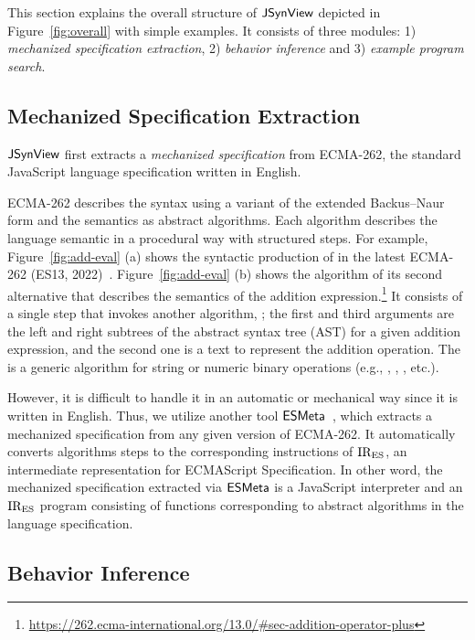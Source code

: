 This section explains the overall structure of $\tool$ depicted in
Figure~\ref{fig:overall} with simple examples.  It consists of three modules: 1)
\textit{mechanized specification extraction}, 2) \textit{behavior inference} and
3) \textit{example program search}.


\subsection{Mechanized Specification Extraction}\label{sec:extract-spec}

$\tool$ first extracts a \textit{mechanized specification} from ECMA-262, the
standard JavaScript language specification written in English.

ECMA-262 describes the syntax using a variant of the extended Backus–Naur form
and the semantics as abstract algorithms.  Each algorithm describes the language
semantic in a procedural way with structured steps.  For example,
Figure~\ref{fig:add-eval} (a) shows the syntactic production of
 in the latest ECMA-262 (ES13, 2022)~\cite{es13}.
Figure~\ref{fig:add-eval} (b) shows the  algorithm of its
second alternative that describes the semantics of the addition
expression.\footnote{\url{https://262.ecma-international.org/13.0/\#sec-addition-operator-plus}}
It consists of a single step that invokes another algorithm,
; the first and third arguments
are the left and right subtrees of the abstract syntax tree (AST) for a given
addition expression, and the second one is a text \code{+} to represent the
addition operation.  The  is a
generic algorithm for string or numeric binary operations (e.g., \code{-},
\code{*}, \code{<}, etc.).

However, it is difficult to handle it in an automatic or mechanical way since it
is written in English.  Thus, we utilize another tool $\esmeta$~\cite{jiset,
esmeta}, which extracts a mechanized specification from any given version of
ECMA-262.  It automatically converts algorithms steps to the corresponding
instructions of $\text{IR}_\text{ES}$, an intermediate representation for ECMAScript
Specification.  In other word, the mechanized specification extracted via
$\esmeta$ is a JavaScript interpreter and an $\text{IR}_\text{ES}$ program consisting of
functions corresponding to abstract algorithms in the language specification.


\subsection{Behavior Inference}\label{sec:reduce-spec}

